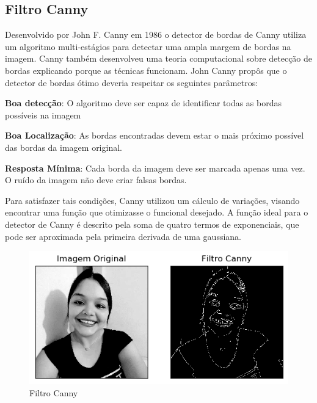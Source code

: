 		\lstset{language=python}
		{\tiny }
	
	\subsection{Filtro Canny}
		Desenvolvido por John F. Canny em 1986 o detector de bordas de Canny utiliza um algoritmo multi-estágios para detectar uma ampla margem de bordas na imagem. Canny também desenvolveu uma teoria computacional sobre detecção de bordas explicando porque as técnicas funcionam.
		John Canny propôs que o detector de bordas ótimo deveria respeitar os seguintes parâmetros:
		
		\begin{description}
			\item \textbf{Boa detecção}: O algoritmo deve ser capaz de identificar todas as bordas possíveis na imagem
			\item \textbf{Boa Localização}: As bordas encontradas devem estar o mais próximo possível das bordas da imagem original.
			\item \textbf{Resposta Mínima}: Cada borda da imagem deve ser marcada apenas uma vez. O ruído da imagem não deve criar falsas bordas.
		\end{description}

		Para satisfazer tais condições, Canny utilizou um cálculo de variações, visando encontrar uma função que otimizasse o funcional desejado. A função ideal para o detector de Canny é descrito pela soma de quatro termos de exponenciais, que pode ser aproximada pela primeira derivada de uma gaussiana.
		
		\begin{figure}[!htb]
			\centering
			\includegraphics[width=\textwidth]{img/13-canny.png}
			\caption{Filtro Canny}
		\end{figure}
		
